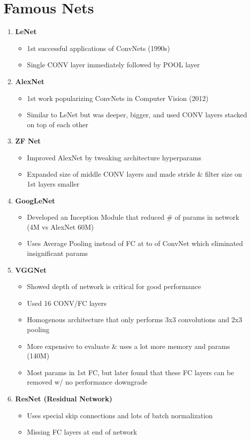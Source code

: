 \documentclass[a4paper,12pt]{article}
\begin{document}
\section{Famous Nets}
\begin{enumerate}
  \item \textbf{LeNet}
  \begin{itemize}
    \item 1st successful applications of ConvNets (1990s)
    \item Single CONV layer immediately followed by POOL layer
  \end{itemize}
  \item \textbf{AlexNet}
  \begin{itemize}
    \item 1st work popularizing ConvNets in Computer Vision (2012)
    \item Similar to LeNet but was deeper, bigger, and used CONV layers stacked on top of each other
  \end{itemize}
  \item \textbf{ZF Net}
  \begin{itemize}
    \item Improved AlexNet by tweaking architecture hyperparams
    \item Expanded size of middle CONV layers and made stride \& filter size on 1st layers smaller
  \end{itemize}
  \item \textbf{GoogLeNet}
  \begin{itemize}
    \item Developed an Inception Module that reduced \# of params in network (4M vs AlexNet 60M)
    \item Uses Average Pooling instead of FC at to of ConvNet which eliminated insignificant params
  \end{itemize}
  \item \textbf{VGGNet}
  \begin{itemize}
    \item Showed depth of network is critical for good performance
    \item Used 16 CONV/FC layers
    \item Homogenous architecture that only performs 3x3 convolutions and 2x3 pooling
    \item More expensive to evaluate \& uses a lot more memory and params (140M)
    \item Most params in 1st FC, but later found that these FC layers can be removed w/ no performance downgrade
  \end{itemize}
  \item \textbf{ResNet (Residual Network)}
  \begin{itemize}
    \item Uses special skip connections and lots of batch normalization
    \item Missing FC layers at end of network
  \end{itemize}
\end{enumerate}
\end{document}
